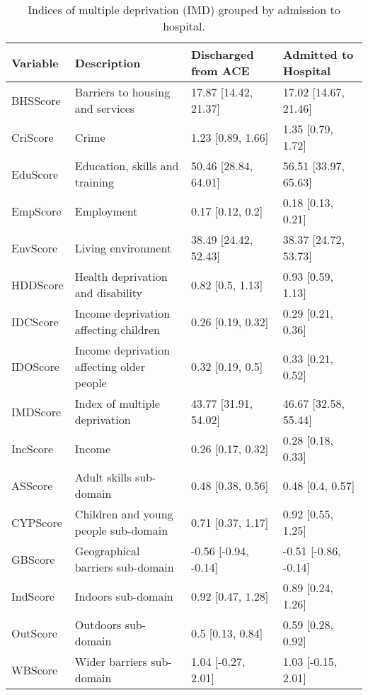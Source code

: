 \begin{table}[H]
\centering
   \caption{Indices of multiple deprivation (IMD) grouped by admission to hospital.}
\begin{tabular}{lP{3.65cm}ll}
  \hline
Variable & Description & Discharged from ACE & Admitted to Hospital \\ 
  \hline
  BHSScore & Barriers to housing and services & 17.87 [14.42, 21.37] & 17.02 [14.67, 21.46] \\ 
  CriScore & Crime & 1.23 [0.89, 1.66] & 1.35 [0.79, 1.72] \\ 
  EduScore & Education, skills and training & 50.46 [28.84, 64.01] & 56.51 [33.97, 65.63] \\ 
  EmpScore & Employment & 0.17 [0.12, 0.2] & 0.18 [0.13, 0.21] \\ 
  EnvScore & Living environment & 38.49 [24.42, 52.43] & 38.37 [24.72, 53.73] \\ 
  HDDScore & Health deprivation and disability & 0.82 [0.5, 1.13] & 0.93 [0.59, 1.13] \\ 
  IDCScore & Income deprivation affecting children & 0.26 [0.19, 0.32] & 0.29 [0.21, 0.36] \\ 
  IDOScore & Income deprivation affecting older people & 0.32 [0.19, 0.5] & 0.33 [0.21, 0.52] \\ 
  IMDScore & Index of multiple deprivation & 43.77 [31.91, 54.02] & 46.67 [32.58, 55.44] \\ 
  IncScore & Income & 0.26 [0.17, 0.32] & 0.28 [0.18, 0.33] \\ 
  ASScore & Adult skills sub-domain& 0.48 [0.38, 0.56] & 0.48 [0.4, 0.57] \\
  CYPScore & Children and young people sub-domain & 0.71 [0.37, 1.17] & 0.92 [0.55, 1.25] \\ 
  GBScore & Geographical barriers sub-domain & -0.56 [-0.94, -0.14] & -0.51 [-0.86, -0.14] \\ 
  IndScore & Indoors sub-domain & 0.92 [0.47, 1.28] & 0.89 [0.24, 1.26] \\ 
  OutScore & Outdoors sub-domain & 0.5 [0.13, 0.84] & 0.59 [0.28, 0.92] \\ 
  WBScore & Wider barriers sub-domain & 1.04 [-0.27, 2.01] & 1.03 [-0.15, 2.01] \\ 
   \hline
\end{tabular}\label{tab:additional-IMD-table}
\end{table}

